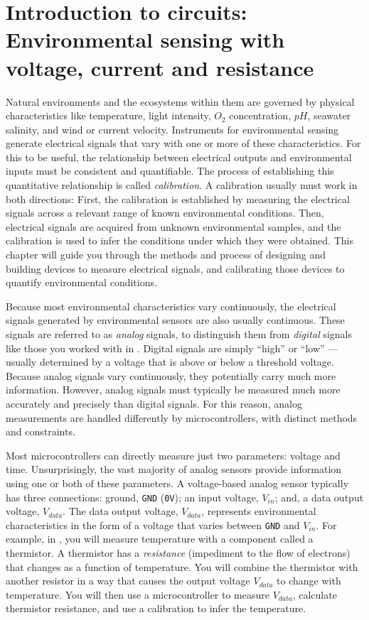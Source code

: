 \setchapterpreamble[u]{\margintoc}
\chapter[Environmental sensing with voltage, current and resistance]{Introduction to circuits: Environmental sensing with voltage, current and resistance}
Natural environments and the ecosystems within them are governed by physical characteristics like temperature, light intensity, $O_2$ concentration, $pH$, seawater salinity, and wind or current velocity.
Instruments for environmental sensing generate electrical signals that vary with one or more of these characteristics.
For this to be useful, the relationship between electrical outputs and environmental inputs must be consistent and quantifiable. 
The process of establishing this quantitative relationship is called \emph{calibration}.
A calibration usually must work in both directions:
First, the calibration is established by measuring the electrical signals across a relevant range of known environmental conditions.
Then,  electrical signals are acquired from unknown environmental samples, and the calibration is used to infer the conditions under which they were obtained.
This chapter will guide you through the methods and process of designing and building devices to measure electrical signals, and calibrating those devices to quantify environmental conditions.

Because most environmental characteristics vary continuously, the electrical signals generated by environmental sensors are also usually continuous. 
These signals are referred to as \emph{analog} signals, to distinguish them from \emph{digital} signals like those you worked with in . 
Digital signals are simply ``high'' or ``low'' --- usually determined by a voltage that is above or below a threshold voltage.
Because analog signals vary continuously, they potentially carry much more information.
However, analog signals must typically be measured much more accurately and precisely than digital signals. 
For this reason, analog measurements are handled differently by microcontrollers, with distinct methods and constraints. 
 
Most microcontrollers can directly measure just two parameters: voltage and time. 
Unsurprisingly, the vast majority of analog sensors provide information using one or both of these parameters. 
A voltage-based analog sensor typically has three connections: ground, \texttt{GND} (\texttt{0V}); an input voltage, $V_{in}$; and, a data output voltage, $V_{data}$.
The data output voltage, $V_{data}$, represents environmental characteristics in the form of a voltage that varies between \texttt{GND} and $V_{in}$.
For example, in , you will measure temperature with a component called a thermistor. 
A thermistor has a \emph{resistance} (impediment to the flow of electrons) that changes as a function of temperature.
You will combine the thermistor with another resistor in a way that causes the output voltage $V_{data}$ to change with temperature. 
You will then use a microcontroller to measure $V_{data}$, calculate thermistor resistance, and use a calibration to infer the temperature.

